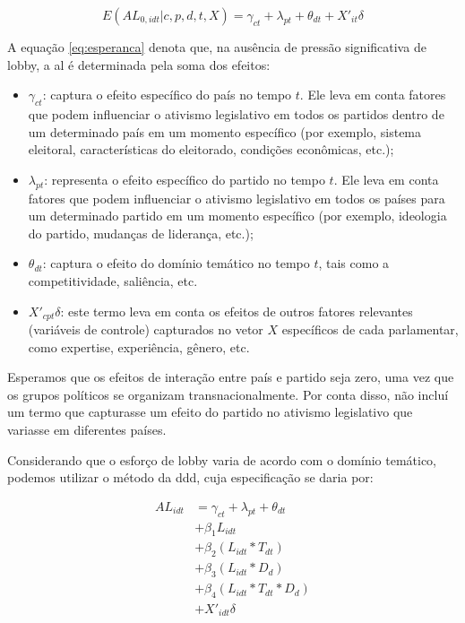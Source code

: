 \begin{equation}
    \label{eq:esperanca}
    E(AL_{0,idt} \vert c,p,d,t,X) = \gamma_{ct} + \lambda_{pt} + \theta_{dt} + X'_{it} \delta
\end{equation}

A equação \ref{eq:esperanca} denota que, na ausência de pressão significativa de lobby, a \acrshort{al} é determinada pela soma dos efeitos:
\begin{itemize}
    \item $\gamma_{ct}$: captura o efeito específico do país no tempo $t$. Ele leva em conta fatores que podem influenciar o ativismo legislativo em todos os partidos dentro de um determinado país em um momento específico (por exemplo, sistema eleitoral, características do eleitorado, condições econômicas, etc.);
    \item $\lambda_{pt}$: representa o efeito específico do partido no tempo $t$. Ele leva em conta fatores que podem influenciar o ativismo legislativo em todos os países para um determinado partido em um momento específico (por exemplo, ideologia do partido, mudanças de liderança, etc.);
    \item $\theta_{dt}$: captura o efeito do domínio temático no tempo $t$, tais como a competitividade, saliência, etc.
    \item $X'_{cpt} \delta$: este termo leva em conta os efeitos de outros fatores relevantes (variáveis de controle) capturados no vetor $X$ específicos de cada parlamentar, como expertise, experiência, gênero, etc.
\end{itemize}

Esperamos que os efeitos de interação entre país e partido seja zero, uma vez que os grupos políticos se organizam transnacionalmente. Por conta disso, não incluí um termo que capturasse um efeito do partido no ativismo legislativo que variasse em diferentes países. 

Considerando que o esforço de lobby varia de acordo com o domínio temático, podemos utilizar o método da \acrfull{ddd}, cuja especificação se daria por:

\begin{equation}
    \begin{split}
        AL_{idt} &= \gamma_{ct} + \lambda_{pt} + \theta_{dt}\\
        &+ \beta_1 L_{idt}\\
        &+ \beta_2 (L_{idt} * T_{dt})\\
        &+ \beta_3 (L_{idt} * D_d)\\
        &+ \beta_4 (L_{idt} * T_{dt} * D_d)\\
        &+ X'_{idt} \delta
    \end{split}
\end{equation}

